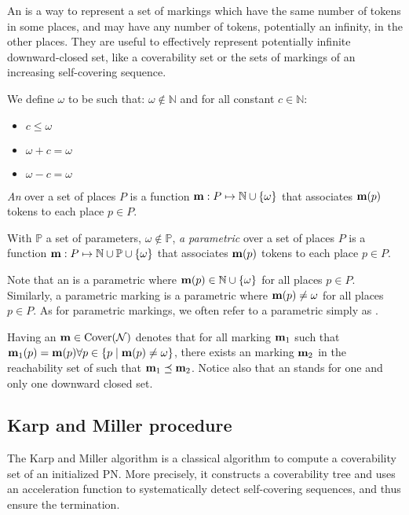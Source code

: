 An \omark is a way to represent a set of markings which have the same number of tokens in some places, and may have any number of tokens, potentially an infinity, in the other places.
They are useful to effectively represent potentially infinite downward-closed set, like a coverability set or the sets of markings of an increasing self-covering sequence.

\begin{defi}[\omark]
  We define $\omega$ to be such that:
  $\omega \notin \mathbb{N}$
  and for all constant $c \in \mathbb{N}$:
  \begin{itemize}
    \item $c \leq \omega$
    \item $\omega + c = \omega$
    \item $\omega - c = \omega$
  \end{itemize}

  \emph{An \omark} \marq over a set of places $P$ is a function $\mathbf{m} : P \mapsto \mathbb{N} \cup \{\omega\}$ that associates $\mathbf{m}(p)$ tokens to each place $p \in P$.

  With $\mathbb{P}$ a set of parameters, $\omega \notin \mathbb{P}$,
  \emph{a parametric \omark} \marq over a set of places $P$ is a function $\mathbf{m} : P \mapsto \mathbb{N} \cup \mathbb{P} \cup \{\omega\}$ that associates $\mathbf{m}(p)$ tokens to each place $p \in P$.
\end{defi}

Note that an \omark \marq is a parametric \omark where $\mathbf{m}(p) \in \mathbb{N} \cup \{\omega\}$ for all places $p \in P$.
Similarly, a parametric marking \marq is a parametric \omark where $\mathbf{m}(p) \neq \omega$ for all places $p \in P$.
As for parametric markings, we often refer to a parametric \omark simply as \omark.

Having an \omark $\mathbf{m} \in \operatorname{Cover}(\mathcal{N})$ denotes that for all marking $\mathbf{m}_1$ such that $\mathbf{m}_1(p) = \mathbf{m}(p) \forall p \in \{p \mid \mathbf{m}(p) \neq \omega\}$, there exists an marking $\mathbf{m}_2$ in the reachability set of \tupleN such that $\mathbf{m}_1 \preceq \mathbf{m}_2$.
Notice also that an \omark stands for one and only one downward closed set.

\subsection{Karp and Miller procedure}

The Karp and Miller algorithm \cite{Karp69} is a classical algorithm to compute a coverability set of an initialized \ac{PN}.
More precisely, it constructs a coverability tree and uses an acceleration function to systematically detect self-covering sequences, and thus ensure the termination.

